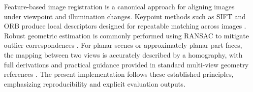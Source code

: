 
Feature-based image registration is a canonical approach for aligning images under viewpoint and illumination changes. Keypoint methods such as SIFT and ORB produce local descriptors designed for repeatable matching across images \cite{Lowe2004SIFT,Rublee2011ORB}. Robust geometric estimation is commonly performed using RANSAC to mitigate outlier correspondences \cite{FischlerBolles1981}. For planar scenes or approximately planar part faces, the mapping between two views is accurately described by a homography, with full derivations and practical guidance provided in standard multi-view geometry references \cite{HartleyZisserman2004}. The present implementation follows these established principles, emphasizing reproducibility and explicit evaluation outputs.
